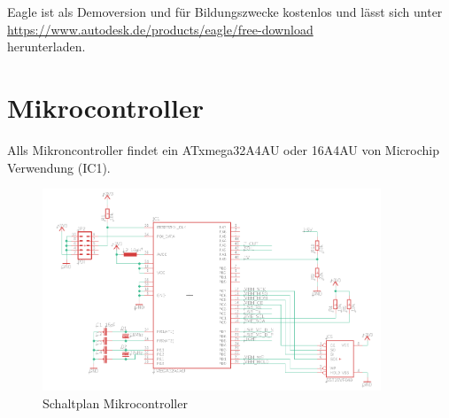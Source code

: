 \documentclass[12pt, a4paper, oneside]{report}
\begin{document}
Eagle ist als Demoversion und für Bildungszwecke kostenlos und lässt sich unter \url{https://www.autodesk.de/products/eagle/free-download}\\ herunterladen.
\section{Mikrocontroller}
\label{sec:Mikrocontroller}
Alls Mikroncontroller findet ein ATxmega32A4AU\cite{ds:xmega} oder 16A4AU von Microchip Verwendung (IC1).

\begin{figure}[h]
	\centering
	\includegraphics[width=0.9\textwidth]{pic/Microcontroller}
	\caption{Schaltplan Mikrocontroller}
	\label{fig:Microcontroller}
\end{figure}
\end{document}
